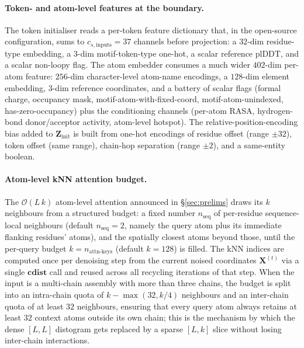 \documentclass{article}
\theoremstyle{plain}
\theoremstyle{definition}
\theoremstyle{remark}
\begin{document}
\paragraph{Token- and atom-level features at the boundary.} The token initialiser reads a per-token feature dictionary that, in the open-source configuration, sums to $c_{s,\text{inputs}}=37$ channels before projection: a $32$-dim residue-type embedding, a $3$-dim motif-token-type one-hot, a scalar reference plDDT, and a scalar non-loopy flag. The atom embedder consumes a much wider $402$-dim per-atom feature: $256$-dim character-level atom-name encodings, a $128$-dim element embedding, $3$-dim reference coordinates, and a battery of scalar flags (formal charge, occupancy mask, motif-atom-with-fixed-coord, motif-atom-unindexed, has-zero-occupancy) plus the conditioning channels (per-atom RASA, hydrogen-bond donor/acceptor activity, atom-level hotspot). The relative-position-encoding bias added to $\mathbf{Z}_\text{init}$ is built from one-hot encodings of residue offset (range $\pm32$), token offset (same range), chain-hop separation (range $\pm 2$), and a same-entity boolean.

\paragraph{Atom-level kNN attention budget.} The $\mathcal{O}(L\,k)$ atom-level attention announced in \S\ref{sec:prelims} draws its $k$ neighbours from a structured budget: a fixed number $n_\text{seq}$ of per-residue sequence-local neighbours (default $n_\text{seq}=2$, namely the query atom plus its immediate flanking residues' atoms), and the spatially closest atoms beyond those, until the per-query budget $k=n_\text{attn-keys}$ (default $k=128$) is filled. The kNN indices are computed once per denoising step from the current noised coordinates $\mathbf{X}^{(t)}$ via a single $\mathbf{cdist}$ call and reused across all recycling iterations of that step. When the input is a multi-chain assembly with more than three chains, the budget is split into an intra-chain quota of $k - \max(32, k/4)$ neighbours and an inter-chain quota of at least $32$ neighbours, ensuring that every query atom always retains at least $32$ context atoms outside its own chain; this is the mechanism by which the dense $[L,L]$ distogram gets replaced by a sparse $[L,k]$ slice without losing inter-chain interactions.
\end{document}
